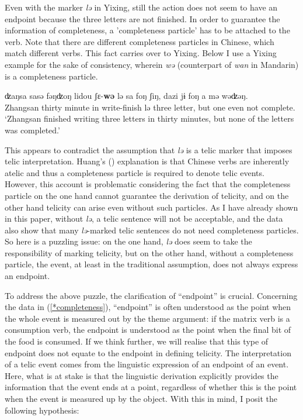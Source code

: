 \documentclass[output=paper]{langsci/langscibook}
\begin{document}
Even with the marker \emph{lə} in Yixing, still the action
does not seem to have an endpoint because the three letters are not finished.
In order to guarantee the information of completeness, a 'completeness
particle' has to be attached to the verb. Note that there are different
completeness particles in Chinese, which match different verbs. This fact
carries over to Yixing. Below I use a Yixing example for the sake of
consistency, wherein \emph{wə} (counterpart of \emph{wan} in Mandarin) is a
completeness particle.

\begin{exe}
    \ex\label{*completeness} 
\sn
    \gll ʣaŋsa {sasə} {fəŋʣoŋ} lidou {ʃε-\textbf{wə}} {lə} sa {foŋ} {ʃiŋ},
    \llap{*}dazi {jɨ} {foŋ} a {mə} wəʣəŋ. \\
    Zhangsan thirty minute in write-finish {lə} three \Clf{} letter, but one \Clf{} even not complete. \\
    \glt \enquote*{Zhangsan finished writing three letters in thirty minutes,
    but none of the letters was completed.}\footnotemark
\end{exe}

This appears to contradict the assumption that \emph{lə} is a telic marker that
imposes telic interpretation. Huang's (\citeyear{huang2015syntactic})
explanation is that Chinese verbs are inherently atelic and thus a completeness
particle is required to denote telic events. However, this account is
problematic considering the fact that the completeness particle on the one hand
cannot guarantee the derivation of telicity, and on the other hand telicity can
arise even without such particles. As I have already shown in this paper,
without \emph{lə}, a telic sentence will not be acceptable, and the data also
show that many \emph{lə}-marked telic sentences do not need completeness
particles. So here is a puzzling issue: on the one hand, \emph{lə} does seem to
take the responsibility of marking telicity, but on the other hand, without a
completeness particle, the event, at least in the traditional assumption, does
not always express an endpoint.

To address the above puzzle, the clarification of ``endpoint'' is crucial.
Concerning the data in (\ref{*completeness}), ``endpoint'' is often understood as
the point when the whole event is measured out by the theme argument: if the
matrix verb is a consumption verb, the endpoint is understood as the point when
the final bit of the food is consumed. If we think further, we will realise
that this type of endpoint does not equate to the endpoint in defining
telicity.  The interpretation of a telic event comes from the linguistic
expression of an endpoint of an event. Here, what is at stake is that the
linguistic derivation explicitly provides the information that the event ends
at a point, regardless of whether this is the point when the event is measured
up by the object. With this in mind, I posit the following hypothesis:
\end{document}
